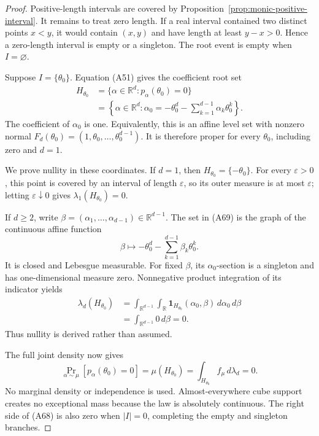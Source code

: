 \begin{proof}
Positive-length intervals are covered by
Proposition~\ref{prop:monic-positive-interval}.  It remains to treat zero
length.  If a real interval contained two distinct points $x<y$, it would
contain $(x,y)$ and have length at least $y-x>0$.  Hence a zero-length
interval is empty or a singleton.  The root event is empty when
$I=\varnothing$.

Suppose $I=\{\theta_0\}$.  Equation \textup{(A51)} gives the coefficient
root set
\[
\begin{aligned}
H_{\theta_0}
&=\{\alpha\in\mathbb R^d:p_\alpha(\theta_0)=0\}\\
&=\left\{\alpha\in\mathbb R^d:
 \alpha_0=-\theta_0^d-\sum_{k=1}^{d-1}\alpha_k\theta_0^k\right\}.
\end{aligned}
\tag{A69}
\]
The coefficient of $\alpha_0$ is one.  Equivalently, this is an affine
level set with nonzero normal
$F_d(\theta_0)=(1,\theta_0,\ldots,\theta_0^{d-1})$.  It is therefore
proper for every $\theta_0$, including zero and $d=1$.

We prove nullity in these coordinates.  If $d=1$, then
$H_{\theta_0}=\{-\theta_0\}$.  For every $\varepsilon>0$, this point is
covered by an interval of length $\varepsilon$, so its outer measure is at
most $\varepsilon$; letting $\varepsilon\downarrow0$ gives
$\lambda_1(H_{\theta_0})=0$.

If $d\geq2$, write
$\beta=(\alpha_1,\ldots,\alpha_{d-1})\in\mathbb R^{d-1}$.  The set in
\textup{(A69)} is the graph of the continuous affine function
\[
\beta\longmapsto-\theta_0^d-
\sum_{k=1}^{d-1}\beta_k\theta_0^k.
\]
It is closed and Lebesgue measurable.  For fixed $\beta$, its
$\alpha_0$-section is a singleton and has one-dimensional measure zero.
Nonnegative product integration of its indicator yields
\[
\begin{aligned}
\lambda_d(H_{\theta_0})
&=\int_{\mathbb R^{d-1}}\int_{\mathbb R}
 \mathbf 1_{H_{\theta_0}}(\alpha_0,\beta)
 \,d\alpha_0\,d\beta\\
&=\int_{\mathbb R^{d-1}}0\,d\beta=0.
\end{aligned}
\tag{A70}
\]
Thus nullity is derived rather than assumed.

The full joint density now gives
\[
\Pr_{\alpha\sim\mu}[p_\alpha(\theta_0)=0]
=\mu(H_{\theta_0})
=\int_{H_{\theta_0}}f_\mu\,d\lambda_d=0.
\tag{A71}
\]
No marginal density or independence is used.  Almost-everywhere cube
support creates no exceptional mass because the law is absolutely
continuous.  The right side of \textup{(A68)} is also zero when
$|I|=0$, completing the empty and singleton branches.
\end{proof}

